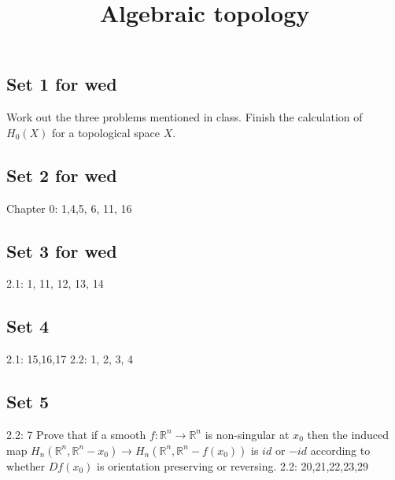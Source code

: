 \documentclass{amsart}
\numberwithin{equation}{section}
\theoremstyle{definition}
\theoremstyle{remark}
\begin{document}
\title{Algebraic topology}
\maketitle
\subsection{Set 1 for wed} 
Work out the three problems mentioned in class. Finish the
calculation of $H _{0} (X) $ for a topological space $X$. 
\subsection{Set 2 for wed}
Chapter 0: 1,4,5, 6, 11, 16 
\subsection{Set 3 for wed}
2.1: 1, 11, 12, 13, 14 
\subsection{Set 4}
2.1: 15,16,17
2.2: 1, 2, 3, 4
\subsection{Set 5}
2.2: 7
Prove that if a smooth $f: \mathbb{R} ^{n} \to \mathbb{R} ^{n} $ is non-singular at $x _{0}$ then the induced map $H _{n}(\mathbb{R}
^{n}, \mathbb{R} ^{n} -x _{0}) \to H _{n}(\mathbb{R}
^{n}, \mathbb{R} ^{n} -f(x _{0}))$ is $id$ or $-id$ according
to whether $Df (x _{0})$ is orientation preserving or
reversing.
2.2: 20,21,22,23,29
% 
% 
\end{document}
